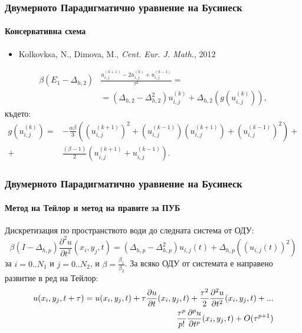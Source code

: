 \documentclass{beamer}
\begin{document}
\begin{frame}
\frametitle{Двумерното Парадигматично уравнение на Бусинеск}
\framesubtitle{Консервативна схема}
\begin{itemize}
\footnotesize
\item Kolkovksa, N., Dimova, M., {\it Cent. Eur. J. Math.}, 2012
\end{itemize}

\begin{align}\label{consFDS}
\beta (E_1-\Delta_{h,2})&\frac{ u^{(k+1)}_{i, j} - 2u^{(k)}_{i,j} + u^{(k-1)}_{i,j} }{\tau^2} =  \nonumber \\
&=(\Delta_{h,2} - \Delta_{h,2}^2)u^{(k)}_{i,j} + \Delta_{h,2}(g(u^{(k)}_{i,j})),
\end{align}
където:
\begin{align}
g(u^{(k)}_{i,j})=& -\frac{\alpha \beta} { 3 } \left( (u^{(k+1)}_{i,j})^2 + (u^{(k-1)}_{i,j})(u^{(k+1)}_{i,j}) + (u^{(k-1)}_{i,j})^2 \right) + \nonumber\\
+&\frac{ (\beta - 1 )}{ 2 }\left( u^{(k+1)}_{i,j} + u^{(k-1)}_{i,j} \right).
\end{align}
\end{frame}


\begin{frame}
\frametitle{Двумерното Парадигматично уравнение на Бусинеск}
\framesubtitle{Метод на Тейлор и метод на правите за ПУБ}

Дискретизация по пространството води до следната система от ОДУ:
\begin{equation}\label{DiscreteEq}
\beta (I-\Delta_{h,p}) \frac{\partial^2 u}{\partial t^2}(x_i, y_j, t)=
 (\Delta_{h,p} - \Delta_{h,p}^2) u_{i, j}(t) + \Delta_{h,p} ( ( u_{i, j}(t) )^2 )
\end{equation}
за $i = 0..N_1$ и $j=0..N_2$, и $\beta = \frac{\beta_1}{\beta_2}$. За всяко ОДУ от системата е направено развитие в ред на Тейлор:
\begin{align} \label{TSe}
\small
u(x_i, y_j, {\small t+\tau}%
) = u(x_i, y_j, t) + \tau \frac{ \partial u }{ \partial t }(x_i, y_j, t)  +  \frac{\tau^2}{2} \frac{ \partial^2 u }{ \partial t^2 }(x_i, y_j, t)  + ... 
\nonumber
\\
\frac{ \tau^p }{ p! } \frac{ \partial^p u }{ \partial t^p }(x_i, y_j, t) + O(\tau^{p+1})
\end{align}

\end{frame}
\end{document}
